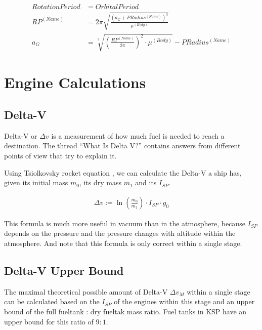 \documentclass[11pt]{report}
\newcommand{\dv}{{\Delta}{v}}
\newcommand{\isp}{I_{SP}}
\begin{document}
\begin{align}
  Rotation Period & = Orbital Period\nonumber\\
RP^{(Name)} & = 2\pi\sqrt{\frac{(a_G+PRadius^{(Name)})^3}{\mu^{(Body)}}}\nonumber\\
a_G & = \sqrt[3]{\left(\frac{RP^{(Name)}}{2\pi}\right)^2\cdot\mu^{(Body)}}-PRadius^{(Name)}
\end{align}

\chapter{Engine Calculations}

\section{Delta-V}

Delta-V or $\dv$  \cite{DeltaV} is a measurement of how
much fuel is needed to reach a destination. The thread ``What Is Delta
V?''  \cite{WhatIsDeltaV} contains answers from different points of
view that try to explain it.

Using Tsiolkovsky rocket equation \cite{TsiolkovskyRocketEquation},
\cite{TsiolkovskyKSP} we can calculate the Delta-V a ship has, given
its initial mass $m_0$, its dry mass $m_1$ and its $\isp$.

\begin{align}
\dv := \ln\left(\frac{m_0}{m_1}\right) \cdot \isp \cdot g_0\label{TsiolkovskyEquation}
\end{align}

This formula is much more useful in vacuum than in the atmosphere,
because $\isp$ depends on the pressure and the pressure changes with
altitude within the atmosphere. And note that this formula is only
correct within a single stage.

\section{Delta-V Upper Bound}

The maximal theoretical possible amount of Delta-V $\dv_M$ within a
single stage can be calculated based on the $\isp$ of the engines
within this stage and an upper bound of the full fueltank : dry
fueltak mass ratio. Fuel tanks in KSP have an upper bound for this
ratio of $9:1$.
\end{document}
